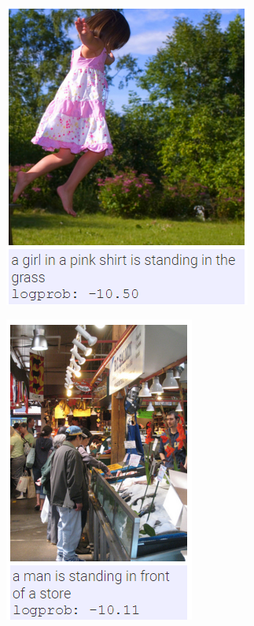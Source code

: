\begin{figure}
\begin{subfigure}{.5\textwidth}
			\label{fig:perfectresults2}
		\end{subfigure}\\
		\begin{subfigure}{.5\textwidth}
			\centering
			\includegraphics[width=.8\linewidth]{Images/Results/Perfect/girl}
			\label{fig:perfectresults3}
		\end{subfigure}%
		\begin{subfigure}{.5\textwidth}
			\centering
			\includegraphics[width=.8\linewidth]{Images/Results/Perfect/main_in_front_of_store}

\end{subfigure}
\end{figure}
